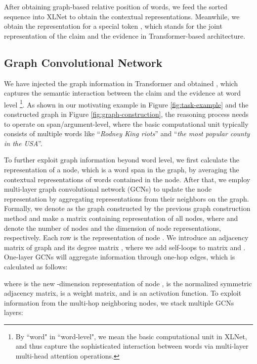 \documentclass[11pt,a4paper]{article}
\begin{document}
After obtaining graph-based relative position of words, we feed
the sorted sequence
into XLNet to obtain the contextual representations. Meanwhile, we obtain the representation  for a special token , which stands for the \mbox{joint} representation of the claim and the evidence in Transformer-based architecture.


\subsection{Graph Convolutional Network}
\label{section:gcn}
We have injected the graph information in Transformer and obtained , which captures the semantic interaction between the claim and the evidence at word level
\footnote{By ``word" in ``word-level", we mean the basic computational unit in XLNet, and thus  capture the sophisticated interaction between words via multi-layer multi-head attention operations. }.
As shown in our motivating example in Figure \ref{fig:task-example} and the constructed graph in Figure \ref{fig:graph-construction}, the reasoning process needs to operate on span/argument-level, where the basic computational unit typically consists of multiple words like ``\textit{Rodney King riots}'' and ``\textit{the most popular county in the USA}''. 





To further exploit graph information beyond word level, we first calculate the representation of a node, which is a word span in the graph, by averaging the contextual representations of words contained in the node.
After that, we employ multi-layer graph convolutional network (GCNs) \cite{kipf2016semi} to update the node representation by aggregating representations from their neighbors on the graph.
Formally, we denote  as the graph constructed by the previous graph construction method and make  a matrix containing representation of all nodes, where  and  denote the number of nodes and the dimension of node representations, respectively. 
Each row  is the representation of node . 
We introduce an adjacency matrix  of graph  and its degree matrix , where we add self-loops to matrix  and . 
One-layer GCNs will aggregate information through one-hop edges, which is calculated as follows: 

where  is the new -dimension representation of node ,  is the normalized symmetric adjacency matrix,  is a weight matrix, and  is an activation function. 
To exploit information from the multi-hop neighboring nodes, we stack multiple GCNs layers:
\end{document}
